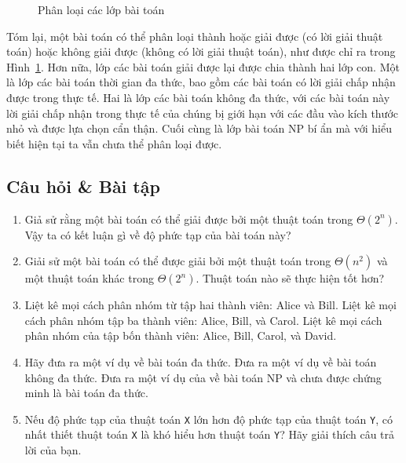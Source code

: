 \begin{figure}
  \centering
  \caption{Phân loại các lớp bài toán}
  \label{fig:fig1112}
\end{figure}

Tóm lại, một bài toán có thể phân loại thành hoặc giải được (có lời giải thuật toán) hoặc
không giải được (không có lời giải thuật toán), như được chỉ ra trong
Hình~\ref{fig:fig1112}. Hơn nữa, lớp các bài toán giải được lại được chia thành hai lớp
con. Một là lớp các bài toán thời gian đa thức, bao gồm các bài toán có lời giải chấp nhận
được trong thực tế. Hai là lớp các bài toán không đa thức, với các bài toán này lời giải
chấp nhận trong thực tế của chúng bị giới hạn với các đầu vào kích thước nhỏ và được lựa
chọn cẩn thận. Cuối cùng là lớp bài toán NP bí ẩn mà với hiểu biết hiện tại ta vẫn chưa
thể phân loại được.


\subsection*{Câu hỏi \& Bài tập}

\begin{enumerate}
\item Giả sử rằng một bài toán có thể giải được bởi một thuật toán trong $\Theta(2^n)$. Vậy
  ta có kết luận gì về độ phức tạp của bài toán này?

\item Giải sử một bài toán có thể được giải bởi một thuật toán trong $\Theta(n^2)$ và một
  thuật toán khác trong $\Theta(2^n)$. Thuật toán nào sẽ thực hiện tốt hơn?


\item Liệt kê mọi cách phân nhóm từ tập hai thành viên: Alice và Bill. Liệt kê mọi cách
  phân nhóm tập ba thành viên: Alice, Bill, và Carol. Liệt kê mọi cách phân nhóm của tập
  bốn thành viên: Alice, Bill, Carol, và David.


\item Hãy đưa ra một ví dụ về bài toán đa thức. Đưa ra một ví dụ về bài toán không đa
  thức. Đưa ra một ví dụ của về bài toán NP và chưa được chứng minh là bài toán đa thức.


\item Nếu độ phức tạp của thuật toán \texttt{X} lớn hơn độ phức tạp của thuật toán
  \texttt{Y}, có nhất thiết thuật toán \texttt{X} là khó hiểu hơn thuật toán \texttt{Y}?
  Hãy giải thích câu trả lời của bạn.
\end{enumerate}





